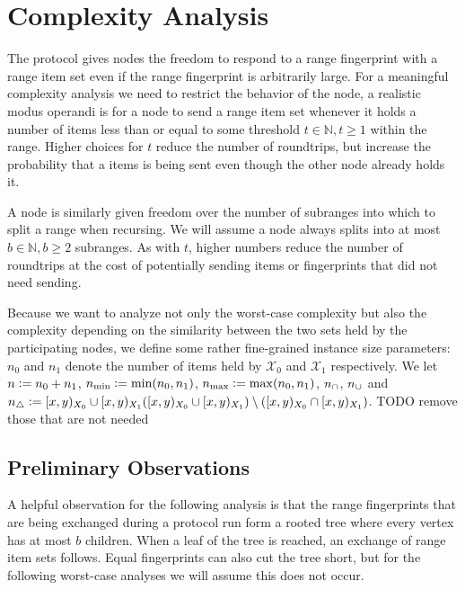 \section{Complexity Analysis}
\label{set-reconciliation-complexity}

The protocol gives nodes the freedom to respond to a range fingerprint with a range item set even if the range fingerprint is arbitrarily large. For a meaningful complexity analysis we need to restrict the behavior of the node, a realistic modus operandi is for a node to send a range item set whenever it holds a number of items less than or equal to some threshold $t \in \mathbb{N}, t \geq 1$ within the range. Higher choices for $t$ reduce the number of roundtrips, but increase the probability that a items is being sent even though the other node already holds it.

A node is similarly given freedom over the number of subranges into which to split a range when recursing. We will assume a node always splits into at most $b \in \mathbb{N}, b \geq 2$ subranges. As with $t$, higher numbers reduce the number of roundtrips at the cost of potentially sending items or fingerprints that did not need sending.

Because we want to analyze not only the worst-case complexity but also the complexity depending on the similarity between the two sets held by the participating nodes, we define some rather fine-grained instance size parameters: $n_0$ and $n_1$ denote the number of items held by $\mathcal{X}_0$ and $\mathcal{X}_1$ respectively. We let $n \vcentcolon= n_0 + n_1$, $n_{\min} \vcentcolon= \min(n_0, n_1)$, $n_{\max} \vcentcolon= \max(n_0, n_1)$, $n_{\cap} \def \abs{\range{x}{y}{X_0} \cap \range{x}{y}{X_1}}$, $n_{\cup} \def \abs{\range{x}{y}{X_0} \cup \range{x}{y}{X_1}}$ and $n_{\triangle} \defeq \abs{(\range{x}{y}{X_0} \cup \range{x}{y}{X_1}) \setminus (\range{x}{y}{X_0} \cap \range{x}{y}{X_1})}$. TODO remove those that are not needed

\subsection{Preliminary Observations}

A helpful observation for the following analysis is that the range fingerprints that are being exchanged during a protocol run form a rooted tree where every vertex has at most $b$ children. When a leaf of the tree is reached, an exchange of range item sets follows. Equal fingerprints can also cut the tree short, but for the following worst-case analyses we will assume this does not occur.

